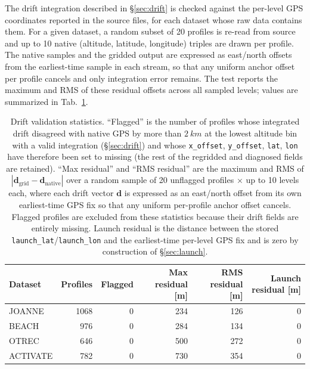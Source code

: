 \documentclass[11pt]{article}
\begin{document}
The drift integration described in \S\ref{sec:drift} is checked against the per-level GPS coordinates reported in the source files, for each dataset whose raw data contains them.  For a given dataset, a random subset of 20 profiles is re-read from source and up to 10 native (altitude, latitude, longitude) triples are drawn per profile.  The native samples and the gridded output are expressed as east/north offsets from the earliest-time sample in each stream, so that any uniform anchor offset per profile cancels and only integration error remains.  The test reports the maximum and RMS of these residual offsets across all sampled levels; values are summarized in Tab.~\ref{tab:drift-validation}.

\begin{table}[h]
\centering
\caption{Drift validation statistics.  ``Flagged'' is the number of profiles whose integrated drift disagreed with native GPS by more than $\SI{2}{km}$ at the lowest altitude bin with a valid integration (\S\ref{sec:drift}) and whose \texttt{x\_offset}, \texttt{y\_offset}, \texttt{lat}, \texttt{lon} have therefore been set to missing (the rest of the regridded and diagnosed fields are retained).  ``Max residual'' and ``RMS residual'' are the maximum and RMS of $|\mathbf{d}_\text{grid} - \mathbf{d}_\text{native}|$ over a random sample of 20 unflagged profiles $\times$ up to 10 levels each, where each drift vector $\mathbf{d}$ is expressed as an east/north offset from its own earliest-time GPS fix so that any uniform per-profile anchor offset cancels.  Flagged profiles are excluded from these statistics because their drift fields are entirely missing.  Launch residual is the distance between the stored \texttt{launch\_lat}/\texttt{launch\_lon} and the earliest-time per-level GPS fix and is zero by construction of \S\ref{sec:launch}.}
\label{tab:drift-validation}
\begin{tabular}{lrrrrr}
\toprule
Dataset           & Profiles  & Flagged        & Max residual [m]  & RMS residual [m]  & Launch residual [m] \\
\midrule
JOANNE            & 1068      & 0              & 234             & 126             & 0 \\
BEACH             & 976       & 0              & 284             & 134             & 0 \\
OTREC             & 646       & 0              & 500             & 272             & 0 \\
ACTIVATE          & 782       & 0              & 730             & 354             & 0 \\

\end{tabular}
\end{table}
\end{document}
